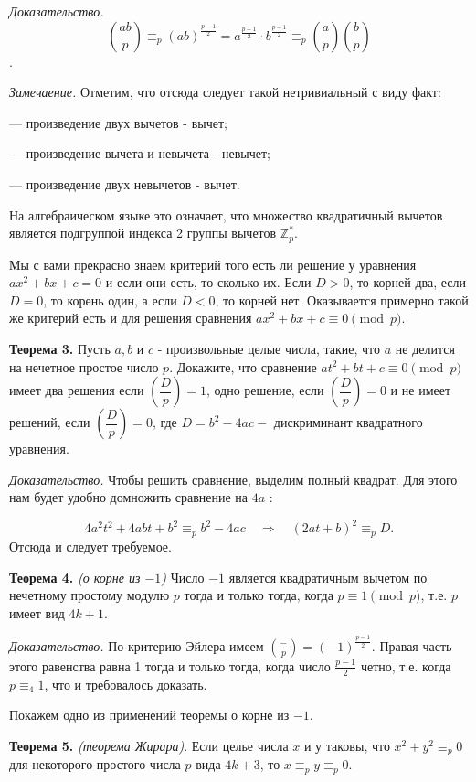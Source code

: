 \textit{Доказательство.}
$$\left(\frac{a b}{p}\right) \equiv_p(a b)^{\frac{p-1}{2}}=a^{\frac{p-1}{2}} \cdot b^{\frac{p-1}{2}} \equiv_p\left(\frac{a}{p}\right)\left(\frac{b}{p}\right)$$.

\textit{Замечаение.} Отметим, что отсюда следует такой нетривиальный с виду факт:

--- произведение двух вычетов - вычет;

--- произведение вычета и невычета - невычет;

--- произведение двух невычетов - вычет.

На алгебраическом языке это означает, что множество квадратичный вычетов является подгруппой индекса 2 группы вычетов $\mathbb{Z}_p^*$.

Мы с вами прекрасно знаем критерий того есть ли решение у уравнения $ax^2 + bx + c = 0$ и если они есть, то сколько их. Если $D>0$, то корней два, если $D=0$, то корень один, а если $D<0$, то корней нет. Оказывается примерно такой же критерий есть и для решения сравнения $ax^2 + bx + c \equiv 0 \pmod{p}$.

\textbf{Теорема 3.}
Пусть $a, b$ и $c$ - произвольные целые числа, такие, что $a$ не делится на нечетное простое число $p$. Докажите, что сравнение $a t^2+bt +c \equiv 0 \pmod{p}$ имеет два решения если $\left(\dfrac{D}{p}\right) = 1$, одно решение, если $\left(\dfrac{D}{p}\right) = 0$ и не имеет решений, если $\left(\dfrac{D}{p}\right) = 0$, где $D=b^2-4 a c-$ дискриминант квадратного уравнения.

\textit{Доказательство.}
Чтобы решить сравнение, выделим полный квадрат. Для этого нам будет удобно домножить сравнение на $4 a$ :

$$
4 a^2 t^2+4 a b t+b^2 \equiv_p b^2-4 a c \quad \Longrightarrow \quad(2 a t+b)^2 \equiv_p D .
$$
Отсюда и следует требуемое. 

\textbf{Теорема 4.}
\textit{(о корне из $-1$)}
Число  $-1$ является квадратичным вычетом по нечетному простому модулю $p$ тогда и только тогда, когда $p \equiv 1\pmod{p}$, т.е. $p$ имеет вид $4 k+1$.

\textit{Доказательство.} 
По критерию Эйлера имеем $\left(\frac{-}{p}\right)=(-1)^{\frac{p-1}{2}}$. Правая часть этого равенства равна 1 тогда и только тогда, когда число $\frac{p-1}{2}$ четно, т.е. когда $p \equiv_4 1$, что и требовалось доказать.

Покажем одно из применений теоремы о корне из $-1$.

\textbf{Теорема 5.}
\textit{(теорема Жирара)}. Если целье числа $x$ и у таковы, что $x^2+y^2 \equiv_p 0$ для некоторого простого числа $p$ вида $4 k+3$, то $x \equiv_p y \equiv_p 0$.

